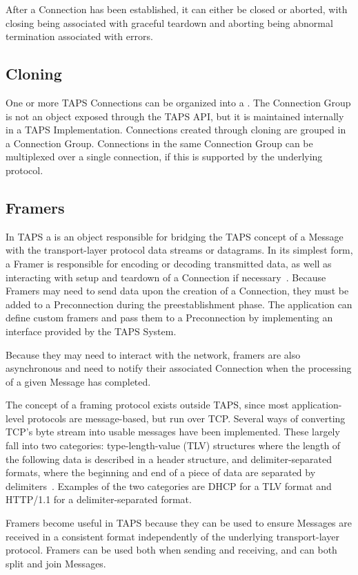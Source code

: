 After a Connection has been established, it can either
be closed or aborted, with closing being associated with graceful teardown
and aborting being abnormal termination associated with errors.

\subsection{Cloning}
One or more TAPS Connections can be organized into a .
The Connection Group is not an object exposed through the TAPS API, but
it is maintained internally in a TAPS Implementation.
Connections created through cloning are grouped
in a Connection Group. Connections in the same Connection Group can be
multiplexed over a single connection, if this is supported by the underlying protocol.

\subsection{Framers}
In TAPS a  is an object responsible for bridging the TAPS concept
of a Message with the transport-layer protocol data streams or datagrams.
In its simplest form, a Framer is responsible for encoding
or decoding transmitted data, as well as interacting with setup and
teardown of a Connection if necessary~\cite[sec.~9.1.2]{rfc9622}. Because Framers may need to send
data upon the creation of a Connection, they must be added to a Preconnection
during the preestablishment phase.
The application can define custom framers and pass them to a Preconnection
by implementing an interface provided by the TAPS System.

Because they may need to interact with the network, 
framers are also asynchronous and need
to notify their associated Connection when the processing of a given Message
has completed.

The concept of a framing protocol exists outside TAPS, since most
application-level protocols are message-based, but run over TCP. Several
ways of converting TCP's byte stream into usable messages have been implemented.
These largely fall into two categories: type-length-value (TLV) structures where
the length of the following data is described in a header structure, and
delimiter-separated formats, where the beginning and end of a piece of
data are separated by delimiters~\cite[sec.~6.1]{rfc9623}.
Examples of the two categories are DHCP for a TLV format
and HTTP/1.1 for a delimiter-separated format.

Framers become useful in TAPS because they can be used to ensure Messages
are received in a consistent format independently of the underlying
transport-layer protocol. Framers can be used both when sending and receiving,
and can both split and join Messages.

